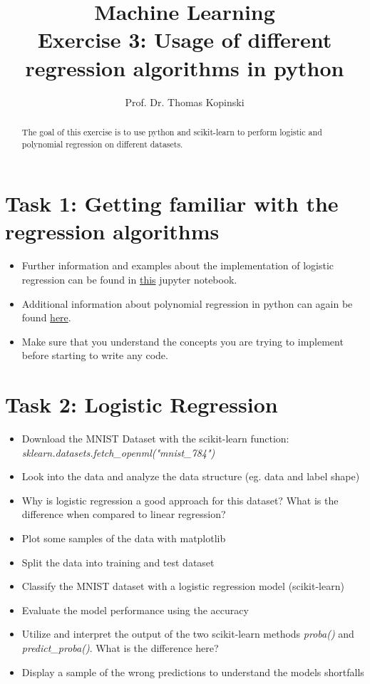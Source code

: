 \documentclass{article}
\title{Machine Learning \\ Exercise 3: Usage of different regression algorithms in python}
\author{Prof. Dr. Thomas Kopinski}
\begin{document}
\maketitle

\begin{abstract}
The goal of this exercise is to use python and scikit-learn to perform logistic and polynomial regression on different datasets.
\end{abstract}

\section*{Task 1: Getting familiar with the regression algorithms}

\begin{itemize}
    \item Further information and examples about the implementation of logistic regression can be found in  \href{https://github.com/rasbt/machine-learning-book/blob/main/ch03/ch03.ipynb}{this} jupyter notebook.
    \item Additional information about polynomial regression in python can again be found \href{https://github.com/DataScienceLabFHSWF/machine-learning-book/blob/main/notebooks/ch09/ch09.ipynb}{here}.
    \item Make sure that you understand the concepts you are trying to implement before starting to write any code.
\end{itemize}

\section*{Task 2: Logistic Regression}

\begin{itemize}
   \item Download the MNIST Dataset with the scikit-learn function: \\ \emph{sklearn.datasets.fetch\_openml("mnist\_784")}
   \item Look into the data and analyze the data structure (eg. data and label shape)
   \item Why is logistic regression a good approach for this dataset? What is the difference when compared to linear regression?
   \item Plot some samples of the data with matplotlib
   \item Split the data into training and test dataset
   \item Classify the MNIST dataset with a logistic regression model (scikit-learn)
   \item Evaluate the model performance using the accuracy
   \item Utilize and interpret the output of the two scikit-learn methods \emph{proba()} and \emph{predict\_proba()}. What is the difference here?
   \item Display a sample of the wrong predictions to understand the models shortfalls
\end{itemize}
\end{document}
